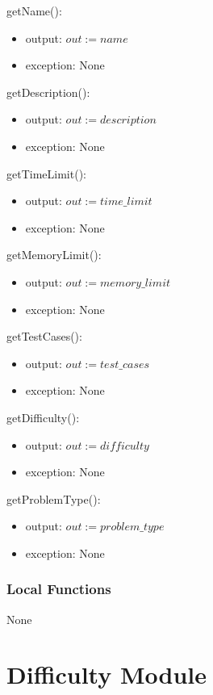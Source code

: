 \documentclass[12pt, titlepage]{article}
\begin{document}
\noindent getName():
\begin{itemize}
\item output: $out := name$
\item exception: None
\end{itemize}

\noindent getDescription():
\begin{itemize}
\item output: $out := description$
\item exception: None
\end{itemize}

\noindent getTimeLimit():
\begin{itemize}
\item output: $out := time\_limit$
\item exception: None
\end{itemize}

\noindent getMemoryLimit():
\begin{itemize}
\item output: $out := memory\_limit$
\item exception: None
\end{itemize}

\noindent getTestCases():
\begin{itemize}
\item output: $out := test\_cases$
\item exception: None
\end{itemize}

\noindent getDifficulty():
\begin{itemize}
\item output: $out := difficulty$
\item exception: None
\end{itemize}

\noindent getProblemType():
\begin{itemize}
\item output: $out := problem\_type$
\item exception: None
\end{itemize}

\subsubsection{Local Functions}
None



\newpage

\section{Difficulty Module} \label{Difficulty} 
\end{document}
